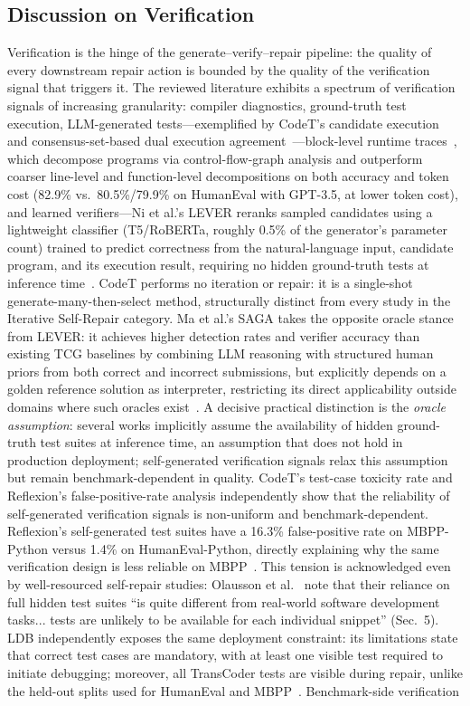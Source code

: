 \documentclass[10pt,a4paper]{article}
\begin{document}
\subsection{Discussion on Verification}
Verification is the hinge of the generate--verify--repair pipeline: the quality of every downstream repair action is bounded by the quality of the verification signal that triggers it. The reviewed literature exhibits a spectrum of verification signals of increasing granularity: compiler diagnostics, ground-truth test execution, LLM-generated tests---exemplified by CodeT's candidate execution and consensus-set-based dual execution agreement~\cite{chenbei2023}---block-level runtime traces~\cite{zhong2024ldb}, which decompose programs via control-flow-graph analysis and outperform coarser line-level and function-level decompositions on both accuracy and token cost (82.9\% vs.\ 80.5\%/79.9\% on HumanEval with GPT-3.5, at lower token cost), and learned verifiers---Ni et al.'s LEVER reranks sampled candidates using a lightweight classifier (T5/RoBERTa, roughly 0.5\% of the generator's parameter count) trained to predict correctness from the natural-language input, candidate program, and its execution result, requiring no hidden ground-truth tests at inference time~\cite{ni2023lever}. CodeT performs no iteration or repair: it is a single-shot generate-many-then-select method, structurally distinct from every study in the Iterative Self-Repair category. Ma et al.'s SAGA takes the opposite oracle stance from LEVER: it achieves higher detection rates and verifier accuracy than existing TCG baselines by combining LLM reasoning with structured human priors from both correct and incorrect submissions, but explicitly depends on a golden reference solution as interpreter, restricting its direct applicability outside domains where such oracles exist~\cite{ma2025saga}. A decisive practical distinction is the \textit{oracle assumption}: several works implicitly assume the availability of hidden ground-truth test suites at inference time, an assumption that does not hold in production deployment; self-generated verification signals relax this assumption but remain benchmark-dependent in quality. CodeT's test-case toxicity rate and Reflexion's false-positive-rate analysis independently show that the reliability of self-generated verification signals is non-uniform and benchmark-dependent. Reflexion's self-generated test suites have a 16.3\% false-positive rate on MBPP-Python versus 1.4\% on HumanEval-Python, directly explaining why the same verification design is less reliable on MBPP~\cite{chenbei2023,shinn2023}. This tension is acknowledged even by well-resourced self-repair studies: Olausson et al.~\cite{olausson2024} note that their reliance on full hidden test suites ``is quite different from real-world software development tasks... tests are unlikely to be available for each individual snippet'' (Sec.~5). LDB independently exposes the same deployment constraint: its limitations state that correct test cases are mandatory, with at least one visible test required to initiate debugging; moreover, all TransCoder tests are visible during repair, unlike the held-out splits used for HumanEval and MBPP~\cite{zhong2024ldb}. Benchmark-side verification 
\end{document}
